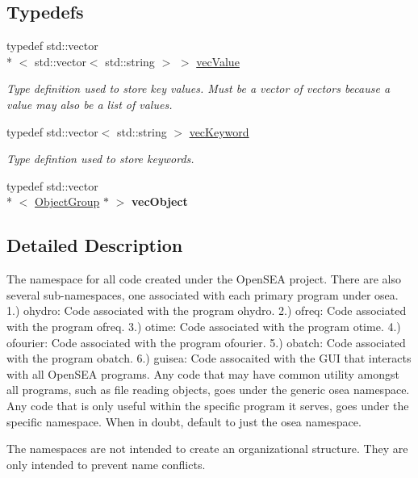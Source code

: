 \subsection*{Typedefs}
\begin{DoxyCompactItemize}
\item 
\hypertarget{namespaceosea_ae7c5f2bab0fab3931b2ef51a0ad04cc2}{typedef std\-::vector\\*
$<$ std\-::vector$<$ std\-::string $>$ $>$ \hyperlink{namespaceosea_ae7c5f2bab0fab3931b2ef51a0ad04cc2}{vec\-Value}}\label{namespaceosea_ae7c5f2bab0fab3931b2ef51a0ad04cc2}

\begin{DoxyCompactList}\small\item\em Type definition used to store key values. Must be a vector of vectors because a value may also be a list of values. \end{DoxyCompactList}\item 
\hypertarget{namespaceosea_af47d453cb217c2c461685cd6e754c070}{typedef std\-::vector$<$ std\-::string $>$ \hyperlink{namespaceosea_af47d453cb217c2c461685cd6e754c070}{vec\-Keyword}}\label{namespaceosea_af47d453cb217c2c461685cd6e754c070}

\begin{DoxyCompactList}\small\item\em Type defintion used to store keywords. \end{DoxyCompactList}\item 
\hypertarget{namespaceosea_ab25fb67447fccb23f5683988d96d2dc2}{typedef std\-::vector\\*
$<$ \hyperlink{classosea_1_1_object_group}{Object\-Group} $\ast$ $>$ {\bfseries vec\-Object}}\label{namespaceosea_ab25fb67447fccb23f5683988d96d2dc2}

\end{DoxyCompactItemize}


\subsection{Detailed Description}
The namespace for all code created under the Open\-S\-E\-A project. There are also several sub-\/namespaces, one associated with each primary program under osea. 1.) ohydro\-: Code associated with the program ohydro. 2.) ofreq\-: Code associated with the program ofreq. 3.) otime\-: Code associated with the program otime. 4.) ofourier\-: Code associated with the program ofourier. 5.) obatch\-: Code associated with the program obatch. 6.) guisea\-: Code assocaited with the G\-U\-I that interacts with all Open\-S\-E\-A programs. Any code that may have common utility amongst all programs, such as file reading objects, goes under the generic osea namespace. Any code that is only useful within the specific program it serves, goes under the specific namespace. When in doubt, default to just the osea namespace.

The namespaces are not intended to create an organizational structure. They are only intended to prevent name conflicts. 